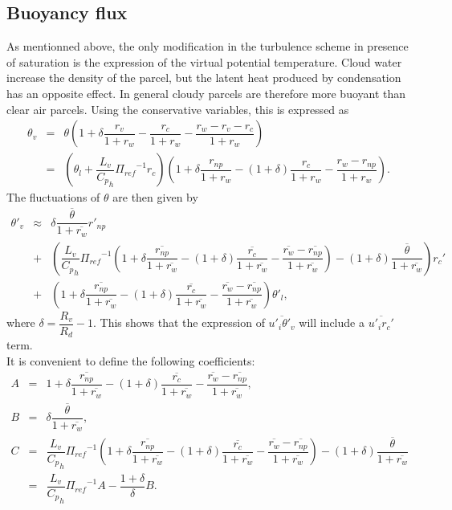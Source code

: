 \subsection{Buoyancy flux}

As mentionned above, the only modification in the turbulence scheme
in presence of saturation is the expression of the virtual potential
temperature. Cloud water increase the density of the parcel, but the
latent heat produced by condensation has an opposite effect. In general
cloudy parcels are therefore more buoyant than clear air parcels. Using
the conservative variables, this is expressed as
\begin{eqnarray}\label{eqn:thetav}
\theta_{v} &=& \theta (1+\delta\dfrac{r_{v}}{1+r_{w}}-
\dfrac{r_{c}}{1+r_{w}}-\dfrac{r_{w}-r_{v}-r_{c}}{1+r_{w}}) \nonumber\\
&=& \left( \theta_{l}+\dfrac{L_{v}}{{C_{p}}_{h}}{{\Pi}_{ref}}^{-1}r_{c} \right)
\left( 1+ \delta \dfrac {r_{np}}{1+r_{w}}-
(1+\delta)\dfrac{r_{c}}{1+r_{w}}-\dfrac{r_{w}-r_{np}}{1+r_{w}} \right).
\end{eqnarray}
The fluctuations of $\theta$ are then given by
\begin{eqnarray}\label{eqn:theta'v}
{\theta}'_{v} &\approx&
\delta \dfrac {\overline{\theta}}{1+\overline{r_{w}}} {r'_{np}}\nonumber\\
&+& \left(\dfrac{L_{v}}{{C_{p}}_{h}}{{\Pi}_{ref}}^{-1}
\left( 1+\delta \dfrac {\overline{r_{np}}}{1+\overline{r_{w}}}-
(1+\delta)\dfrac {\overline{r_{c}}}{1+\overline{r_{w}}}
-\dfrac{\overline{r_{w}}-\overline{r_{np}}}{1+\overline{r_{w}}}\right)-(1+\delta)
\dfrac {\overline{\theta}}{1+\overline{r_{w}}}\right) {r_{c}}'\nonumber\\
&+& \left(1+\delta \dfrac {\overline{r_{np}}}{1+\overline{r_{w}}} -
(1+\delta)\dfrac{\overline{r_{c}}}{1+\overline{r_{w}}}
-\dfrac{\overline{r_{w}}-\overline{r_{np}}}{1+\overline{r_{w}}}\right)
{\theta}'_{l},
\end{eqnarray}
where $\delta = \dfrac{R_{v}}{R_{d}}-1$.  This shows that the expression of
$\overline{{u'_{i}}{{\theta}'_{v}}}$ will include a
$\overline{{u'_{i}}{{r_{c}}'}}$ term.\\

It is convenient to define the following coefficients:
\begin{eqnarray}
A &=& 1+\delta \dfrac {\overline{r_{np}}}{1+\overline{r_{w}}} -
(1+\delta)\dfrac {\overline{r_{c}}} {1+\overline{r_{w}}}-
\dfrac{\overline{r_{w}}-\overline{r_{np}}}{1+\overline{r_{w}}}, \\
B&=&\delta \dfrac {\overline{\theta}} {1+\overline{r_{w}}}, \\
C&=&\dfrac{L_{v}}{{C_{p}}_{h}}{{\Pi}_{ref}}^{-1}
\left(1+\delta \dfrac {\overline{r_{np}}} {1+\overline{r_{w}}} -
(1+\delta)\dfrac {\overline{r_{c}}} {1+\overline{r_{w}}}-
\dfrac{\overline{r_{w}}-\overline{r_{np}}}{1+\overline{r_{w}}} \right)
 - (1+\delta) \dfrac {\overline{\theta}} {1+\overline{r_{w}}} \nonumber \\
&=&\dfrac {L_{v}} {{C_{p}}_{h}} {{\Pi}_{ref}}^{-1} A -
\dfrac{1+\delta}{\delta} B.
\end{eqnarray}

